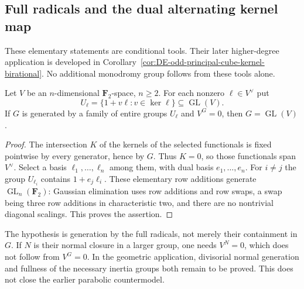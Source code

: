 \subsection{Full radicals and the dual alternating kernel map}
These elementary statements are conditional tools. Their later
higher-degree application is developed in
Corollary~\ref{cor:DE-odd-principal-cube-kernel-birational}.
No additional monodromy group follows from these tools alone.
\begin{lemma}
\label{lem:root-full-radical-generation}
Let $V$ be an $n$-dimensional $\mathbf F_2$-space, $n\geq2$. For each
nonzero $\ell\in V^\vee$ put
\[
 U_\ell=\{1+v\ell:v\in\ker\ell\}\subseteq\operatorname{GL}(V).
\]
If $G$ is generated by a family of entire groups $U_\ell$ and $V^G=0$,
then $G=\operatorname{GL}(V)$.
\end{lemma}
\begin{proof}
The intersection $K$ of the kernels of the selected
functionals is fixed pointwise by every generator, hence by $G$.
Thus $K=0$, so those functionals span $V^\vee$. Select a basis
$\ell_1,\ldots,\ell_n$ among them, with dual basis $e_1,\ldots,e_n$.
For $i\ne j$ the group $U_{\ell_i}$ contains $1+e_j\ell_i$.
These elementary row additions generate $\operatorname{GL}_n(\mathbf F_2)$:
Gaussian elimination uses row additions and row swaps, a swap being
three row additions in characteristic two, and there are no nontrivial
diagonal scalings. This proves the assertion.
\end{proof}

The hypothesis is generation by the full radicals, not merely their
containment in $G$. If $N$ is their normal closure in a larger group,
one needs $V^N=0$, which does not follow from $V^G=0$. In the geometric
application, divisorial normal generation and fullness of the necessary
inertia groups both remain to be proved. This does not close the earlier
parabolic countermodel.

